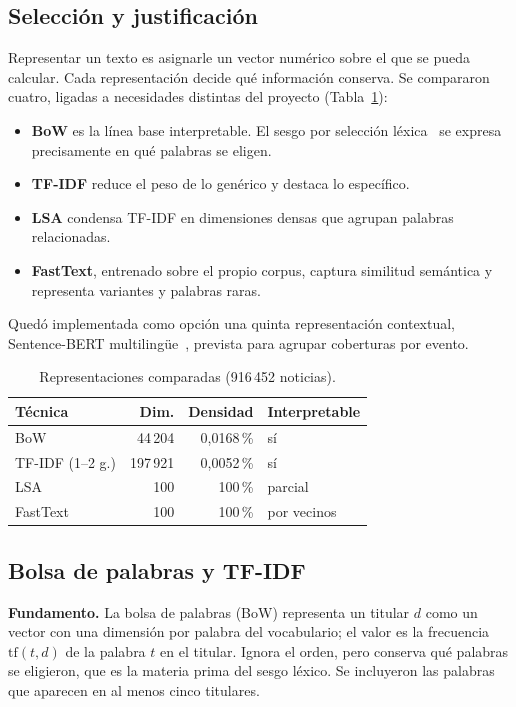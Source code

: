 \documentclass[10pt,twocolumn]{article}
\begin{document}
\subsection{Selección y justificación}

Representar un texto es asignarle un vector numérico sobre el que se pueda
calcular. Cada representación decide qué información conserva. Se compararon
cuatro, ligadas a necesidades distintas del proyecto (Tabla~\ref{tab:rep}):

\begin{itemize}
\item \textbf{BoW} es la línea base interpretable. El sesgo por selección
léxica~\cite{hamborg2019,hamborg2020} se expresa precisamente en qué palabras
se eligen.
\item \textbf{TF-IDF} reduce el peso de lo genérico y destaca lo específico.
\item \textbf{LSA} condensa TF-IDF en dimensiones densas que agrupan palabras
relacionadas.
\item \textbf{FastText}, entrenado sobre el propio corpus, captura similitud
semántica y representa variantes y palabras raras.
\end{itemize}

Quedó implementada como opción una quinta representación contextual,
Sentence-BERT multilingüe~\cite{reimers2019}, prevista para agrupar coberturas
por evento.

\begin{table}[t]
\centering\small
\caption{Representaciones comparadas (916\,452 noticias).}
\label{tab:rep}
\begin{tabular}{lrrl}
\toprule
Técnica & Dim. & Densidad & Interpretable\\
\midrule
BoW              &  44\,204 & 0{,}0168\,\% & sí\\
TF-IDF (1--2 g.) & 197\,921 & 0{,}0052\,\% & sí\\
LSA              &      100 & 100\,\%      & parcial\\
FastText         &      100 & 100\,\%      & por vecinos\\
\bottomrule
\end{tabular}
\end{table}

\subsection{Bolsa de palabras y TF-IDF}

\textbf{Fundamento.} La bolsa de palabras (BoW) representa un titular $d$ como
un vector con una dimensión por palabra del vocabulario; el valor es la
frecuencia $\mathrm{tf}(t,d)$ de la palabra $t$ en el titular. Ignora el orden,
pero conserva qué palabras se eligieron, que es la materia prima del sesgo
léxico. Se incluyeron las palabras que aparecen en al menos cinco titulares.
\end{document}
